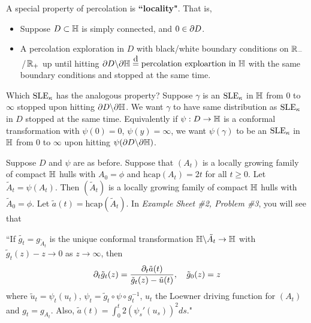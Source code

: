 \documentclass[12pt,a4paper]{article}
\newcommand\xeq{\stackrel{\mathclap{\normalfont\mbox{d}}}{=}}
\newenvironment{subproof}
{\begin{changemargin}{0.5cm}{0.5cm} 
	}%
	{\end{changemargin}
}
\renewenvironment{i}
{\begin{itemize} 
	}%
	{\end{itemize}
}
\begin{document}
\quad A special property of percolation is \textbf{``locality"}. That is,
\begin{i}
\item Suppose $D\subset \mathbb{H}$ is simply connected, and $0\in \partial D$.
\item A percolation exploration in $D$ with black/white boundary conditions on $\mathbb{R}_-$\,/\,$\mathbb{R}_+$ up until hitting $\pa D \backslash \pa \H \xeq \text{percolation exploartion in } \H$ with the same boundary conditions and stopped at the same time. 
\end{i}
\quad Which $\text{SLE}_{\kappa}$ has the analogous property? Suppose $\gamma$ is an $\text{SLE}_{\kappa}$ in $\mathbb{H}$ from $0$ to $\infty$ stopped upon hitting $\partial D \backslash \partial \mathbb{H}$. We want $\gamma$ to have same distribution as $\text{SLE}_{\kappa}$ in $D$ stopped at the same time. Equivalently if $\psi : D\rightarrow \mathbb{H}$ is a conformal transformation with $\psi(0)=0$, $\psi(y) = \infty$, we want $\psi(\gamma)$ to be an $\text{SLE}_{\kappa}$ in $\mathbb{H}$ from 0 to $\infty$ upon hitting $\psi(\partial D \backslash \partial \mathbb{H})$.

\quad Suppose $D$ and $\psi$ are as before. Suppose that $(A_t)$ is a locally growing family of compact $\mathbb{H}$ hulls with $A_0 = \phi$ and $\text{hcap}(A_t) =2t$ for all $t\geq 0$. Let $\tilde{A}_t = \psi(A_t)$. Then $(\tilde{A}_t)$ is a locally growing family of compact $\mathbb{H}$ hulls with $\tilde{A}_0 =\phi$. Let $\tilde{a}(t) = \text{hcap}(\tilde{A}_t)$. In \emph{Example Sheet \#2, Problem \#3}, you will see that
\begin{subproof}
``If $\tilde{g_t} = g_{\tilde{A}_t}$ is the unique conformal transformation $\mathbb{H} \backslash \tilde{A_t} \rightarrow \mathbb{H}$ with $\tilde{g}_t(z) -z \rightarrow 0$ as $z\rightarrow \infty$, then
\begin{align*}
\partial_t \tilde{g}_t (z) = \frac{\partial_t \tilde{a}(t)}{\tilde{g}_t(z) - \tilde{u}(t)}, \quad \tilde{g}_0(z) = z
\end{align*}
where $\tilde{u}_t = \psi_t(u_t)$, $\psi_t = \tilde{g}_t \circ \psi \circ g_t^{-1}$, $u_t$ the Loewner driving function for $(A_t)$ and $g_t = g_{A_t}$. Also, $\tilde{a}(t) = \int_0^t 2(\psi_s'(u_s))^2 ds$."
\end{subproof}
\s
\end{document}
